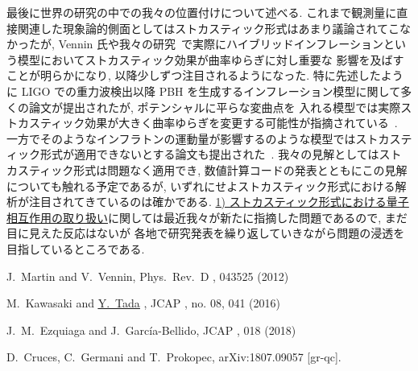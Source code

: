\documentclass[11pt,a4j,dvipdfmx]{jarticle} 					%
\newcommand{\研究課題名}{\mgfamily\sffamily ストカスティック形式で迫る重力と量子論}
\newcommand{\研究機関名}{\mgfamily\sffamily 名古屋大学}
\newcommand{\研究代表者氏名}{\mgfamily\sffamily 多田祐一郎}
\newcommand{\me}{\underline{\underline{Y.~Tada}} }
\newcommand{\研究期間の最終元号年度}{34}  %
\renewcommand{\bf}{\bfseries\sffamily\gtfamily}
\begin{document}
最後に世界の研究の中での我々の位置付けについて述べる. これまで観測量に直接関連した現象論的側面としてはストカスティック形式はあまり議論されてこなかったが,
Vennin 氏や我々の研究~\cite{Kawasaki:2015ppx}で実際にハイブリッドインフレーションという模型においてストカスティック効果が曲率ゆらぎに対し重要な
影響を及ばすことが明らかになり, 以降少しずつ注目されるようになった.
特に先述したように LIGO での重力波検出以降 PBH を生成するインフレーション模型に関して多くの論文が提出されたが, ポテンシャルに平らな変曲点を
入れる模型では実際ストカスティック効果が大きく曲率ゆらぎを変更する可能性が指摘されている~\cite{Ezquiaga:2018gbw}.
一方でそのようなインフラトンの運動量が影響するのような模型ではストカスティック形式が適用できないとする論文も提出された~\cite{Cruces:2018cvq}.
我々の見解としてはストカスティック形式は問題なく適用でき, 数値計算コードの発表とともにこの見解についても触れる予定であるが,
いずれにせよストカスティック形式における解析が注目されてきているのは確かである.
\ul{1) ストカスティック形式における量子相互作用の取り扱い}に関しては最近我々が新たに指摘した問題であるので, まだ目に見えた反応はないが
各地で研究発表を繰り返していきながら問題の浸透を目指しているところである.






\vspace{1cm}
\begin{thebibliography}{99}
  J.~Martin and V.~Vennin,
  Phys.\ Rev.\ D {\bf 85}, 043525 (2012)
  
  M.~Kawasaki and \me,
  JCAP {\bf 1608}, no. 08, 041 (2016)
  
  J.~M.~Ezquiaga and J.~Garc\'ia-Bellido,
  JCAP {\bf 1808}, 018 (2018)
  
  D.~Cruces, C.~Germani and T.~Prokopec,
  arXiv:1807.09057 [gr-qc].
\end{thebibliography}
\end{document}
